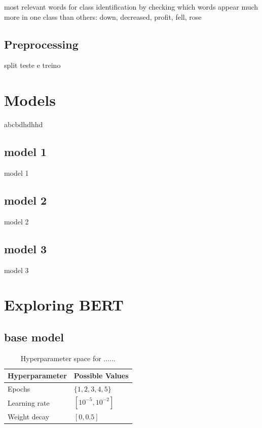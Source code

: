\documentclass[conference]{IEEEtran}
\begin{document}
most relevant words for class identification by checking which words appear much more in one class than others: down, decreased, profit, fell, rose


\subsection{Preprocessing}

split teste e treino

\section{Models}

abcbdhdhhd

\subsection{model 1}

model 1


\subsection{model 2}

model 2

\subsection{model 3}

model 3

\section{Exploring BERT}

\subsection{base model}

\begin{table}[H]
\centering
\caption{Hyperparameter space for ......}
\label{parameters_basebert}
\begin{tabular}{ll}
\toprule
\textbf{Hyperparameter} & \textbf{Possible Values} \\
\midrule
Epochs & $\{1,2,3,4,5\}$ \\
Learning rate & $[10^{-5}, 10^{-2}]$ \\
Weight decay & $[0, 0.5]$ \\
\bottomrule
\end{tabular}
\end{table}
\end{document}
